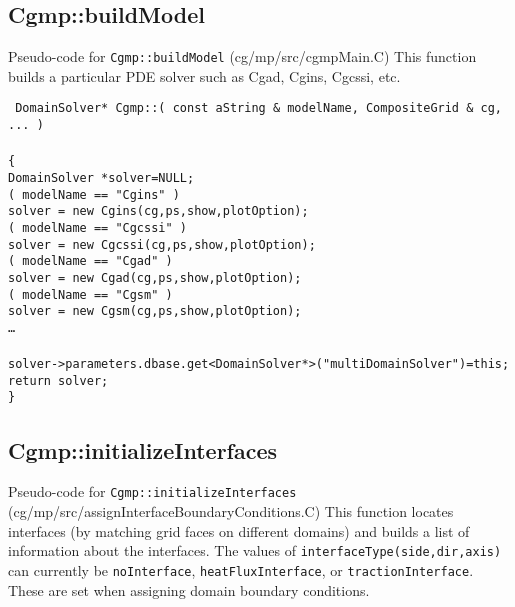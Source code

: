 \subsection{Cgmp::buildModel}
Pseudo-code for {\tt Cgmp::buildModel} (cg/mp/src/cgmpMain.C)
This function builds a particular PDE solver such as Cgad, Cgins, Cgcssi, etc.

\begin{flushleft}\tt\small
DomainSolver* Cgmp::( const aString \& modelName, CompositeGrid \& cg, ... ) \\
\\
\{  \\
\ia  DomainSolver *solver=NULL; \\ 
\ia  \IF( modelName == "Cgins" )  \\
\ib    solver = new Cgins(cg,ps,show,plotOption); \\
\ia  \ELSEIF(  modelName == "Cgcssi" )  \\
\ib    solver = new Cgcssi(cg,ps,show,plotOption); \\
\ia  \ELSEIF(  modelName == "Cgad" )  \\
\ib    solver = new Cgad(cg,ps,show,plotOption); \\
\ia  \ELSEIF(  modelName == "Cgsm" )  \\
\ib    solver = new Cgsm(cg,ps,show,plotOption); \\
\ia  \ldots \\
\ia  \END \\
\ia  solver->parameters.dbase.get<DomainSolver*>("multiDomainSolver")=this; \\
\ia  return solver; \\
\}
\end{flushleft}




\subsection{Cgmp::initializeInterfaces}
Pseudo-code for {\tt Cgmp::initializeInterfaces} (cg/mp/src/assignInterfaceBoundaryConditions.C)
This function locates interfaces (by matching grid faces on different domains) and builds a list 
of information about the interfaces. The values of {\tt interfaceType(side,dir,axis)} can currently 
be {\tt noInterface}, {\tt heatFluxInterface}, or {\tt tractionInterface}. These are set when
assigning domain boundary conditions.

